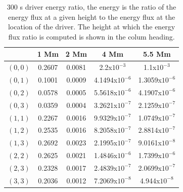\documentclass[preprint,authoryear,12pt]{elsarticle}
\begin{document}
\begin{table}[h]
\centering
\begin{tabular}{c c c c c }
\hline
   &  1 Mm & 2 Mm & 4 Mm & 5.5 Mm \\
\hline
$(0, 0)$ &  0.2607 & 0.0081 & 2.2x$10^{-3}$ &  1.1x$10^{-3}$\\
\hline
$(0, 1)$ & 0.1001 & 0.0009 & 4.1494x$10^{-6}$ &  1.3059x$10^{-6}$\\
\hline
$(0, 2)$ & 0.0578 & 0.0005 & 5.5618x$10^{-6}$ &  4.1907x$10^{-6}$\\
\hline
$(0, 3)$ & 0.0359 & 0.0004 &3.2621x$10^{-7}$ &  2.1259x$10^{-7}$\\
\hline
$(1, 1)$ & 0.2267 & 0.0016 & 9.9329x$10^{-7}$ &  1.0749x$10^{-7}$\\
\hline
$(1, 2)$ & 0.2535 & 0.0016 & 8.2058x$10^{-7}$ &  2.8814x$10^{-7}$\\
\hline
$(1, 3)$ & 0.2692 & 0.0023 & 2.1995x$10^{-7}$ &  9.0161x$10^{-8}$\\
\hline
$(2, 2)$ & 0.2625 & 0.0021 & 1.4846x$10^{-6}$ &  1.7399x$10^{-6}$\\
\hline
$(2, 3)$ & 0.2328 & 0.0017 & 2.4839x$10^{-7}$ &  2.0699x$10^{-7}$\\
\hline
$(3, 3)$ & 0.2036 & 0.0012 & 7.2069x$10^{-8}$ &  4.944x$10^{-8}$\\
\hline
\end{tabular} 
\caption{300 s driver energy ratio, the energy is the ratio of the energy flux at a given height to the energy flux at the location of the driver. The height at which the energy flux ratio is computed is shown in the colum heading.}
\label{Table300mode}
\end{table}









\end{document}
